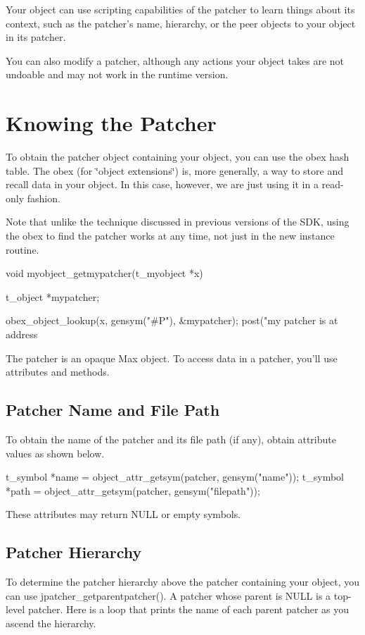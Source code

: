 Your object can use scripting capabilities of the patcher to learn things about its context, such as the patcher's name, hierarchy, or the peer objects to your object in its patcher.

You can also modify a patcher, although any actions your object takes are not undoable and may not work in the runtime version.\hypertarget{chapter_scripting_chapter_scripting_knowing}{}\section{Knowing the Patcher}\label{chapter_scripting_chapter_scripting_knowing}
To obtain the patcher object containing your object, you can use the obex hash table. The obex (for \char`\"{}object extensions\char`\"{}) is, more generally, a way to store and recall data in your object. In this case, however, we are just using it in a read-\/only fashion.

Note that unlike the technique discussed in previous versions of the SDK, using the obex to find the patcher works at any time, not just in the new instance routine.


\begin{DoxyCode}
    void myobject_getmypatcher(t_myobject *x)
    {
        t_object *mypatcher;

        obex_object_lookup(x, gensym("#P"), &mypatcher);
        post("my patcher is at address %
    }
\end{DoxyCode}


The patcher is an opaque Max object. To access data in a patcher, you'll use attributes and methods.\hypertarget{chapter_scripting_chapter_scripting_knowing_name}{}\subsection{Patcher Name and File Path}\label{chapter_scripting_chapter_scripting_knowing_name}
To obtain the name of the patcher and its file path (if any), obtain attribute values as shown below. 
\begin{DoxyCode}
        t_symbol *name = object_attr_getsym(patcher, gensym("name"));
        t_symbol *path = object_attr_getsym(patcher, gensym("filepath"));
\end{DoxyCode}


These attributes may return NULL or empty symbols.\hypertarget{chapter_scripting_chapter_scripting_knowing_heirarchy}{}\subsection{Patcher Hierarchy}\label{chapter_scripting_chapter_scripting_knowing_heirarchy}
To determine the patcher hierarchy above the patcher containing your object, you can use jpatcher\_\-getparentpatcher(). A patcher whose parent is NULL is a top-\/level patcher. Here is a loop that prints the name of each parent patcher as you ascend the hierarchy.


